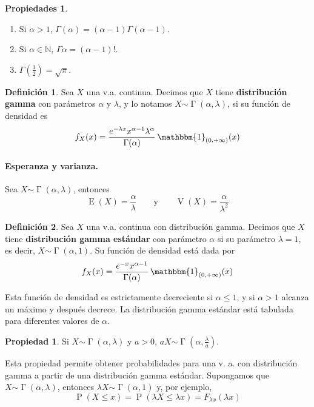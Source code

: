 \documentclass[11pt]{article}
\theoremstyle{plain}
\theoremstyle{definition}
\newtheorem*{defi}{Definición}
\newtheorem*{prop}{Propiedad}
\newtheorem*{props}{Propiedades}
\theoremstyle{remark}
\newcommand{\deft}[1]{\textbf{#1}}  %
\newcommand{\proba}{\ensuremath{\operatorname{P}}}  %
\newcommand{\esp}[0]{\ensuremath{\operatorname{E}}}  %
\newcommand{\var}[0]{\ensuremath{\operatorname{V}}}  %
\newcommand{\indi}[1]{\ensuremath{\mathbbm{1}_{#1}}}  %
\newcommand{\dist}[1]{\ensuremath{\sim \operatorname{#1}}}  %
\begin{document}
      \begin{props} \ 
        \begin{enumerate}
          \item Si $\alpha > 1$, $\Gamma(\alpha) = (\alpha - 1) \Gamma(\alpha - 1)$.
          \item Si $\alpha \in \mathbb{N}$, $\Gamma{\alpha} = (\alpha - 1)!$.
          \item $\Gamma(\frac{1}{2}) = \sqrt{\pi}$.
        \end{enumerate}
      \end{props}

      \begin{defi}
        Sea $X$ una v.a. continua. Decimos que $X$ tiene \deft{distribución gamma} con parámetros $\alpha$ y $\lambda$, y lo notamos $X \dist{\Gamma}(\alpha,\lambda)$, si su función de densidad es
        \[ f_X(x) = \frac{e^{- \lambda x} x^{\alpha - 1} \lambda^\alpha}{\Gamma(\alpha)} \, \indi{(0,+ \infty)}(x) \]
      \end{defi}

      \paragraph{Esperanza y varianza.}
      Sea $X \dist{\Gamma}(\alpha,\lambda)$, entonces
      \[ \esp(X) = \frac{\alpha}{\lambda} \qquad \text{y} \qquad \var(X) = \frac{\alpha}{\lambda^2} \]

      \begin{defi}
        Sea $X$ una v.a. continua con distribución gamma. Decimos que $X$ tiene \deft{distribución gamma estándar} con parámetro $\alpha$ si su parámetro $\lambda = 1$, es decir, $X \dist{\Gamma}(\alpha,1)$. Su función de densidad está dada por
        \[ f_X(x) = \frac{e^{-x} x^{\alpha - 1}}{\Gamma(\alpha)} \, \indi{(0,+\infty)}(x) \]
      \end{defi}

      Esta función de densidad es estrictamente decreciente si $\alpha \leq 1$, y si $\alpha > 1$ alcanza un máximo y después decrece.
      La distribución gamma estándar está tabulada para diferentes valores de $\alpha$.

      \begin{prop}
        Si $X \dist{\Gamma}(\alpha,\lambda)$ y $a > 0$, $a X \dist{\Gamma}(\alpha, \frac{\lambda}{a})$.

        Esta propiedad permite obtener probabilidades para una v. a. con distribución gamma a partir de una distribución gamma estándar. Supongamos que $X \dist{\Gamma}(\alpha,\lambda)$, entonces $\lambda X \dist{\Gamma}(\alpha,1)$ y, por ejemplo,
        \[ \proba(X \leq x) = \proba(\lambda X \leq \lambda x) = F_{\lambda x} (\lambda x) \]
      \end{prop}
\end{document}

